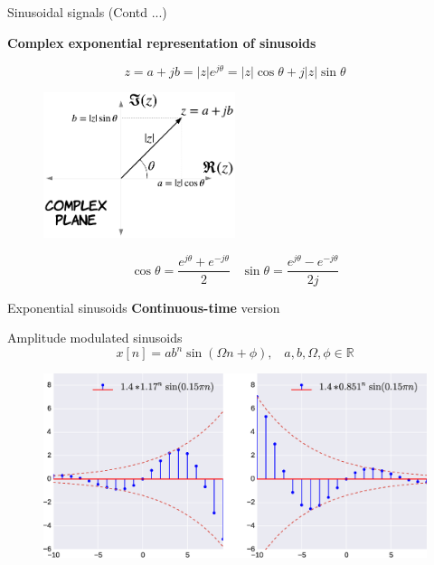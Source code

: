 \documentclass{beamer}
\begin{document}
\begin{frame}[t]{Sinusoidal signals (Contd ...)}\

\textbf{Complex exponential representation of sinusoids}

\[ z = a + jb = \left|z\right|e^{j\theta} = \left|z\right|\cos \theta + j \left|z\right|\sin \theta\]

\begin{figure}
\includegraphics[width=0.5\textwidth]{img/complex_plane.png}
\end{figure}

\[ \cos \theta = \frac{e^{j\theta} + e^{-j\theta}}{2} \,\,\,\,\, \sin \theta = \frac{e^{j\theta} - e^{-j\theta}}{2j}\]

\end{frame}

\begin{frame}[t]{Exponential sinusoids}
\textbf{Continuous-time} version

Amplitude modulated sinusoids
\[ x[n] = a b^{n} \sin \left(\Omega n + \phi \right), \,\,\,\,\, a, b, \Omega, \phi \in \mathbb{R}\]

\begin{figure}
\includegraphics[width=\textwidth]{img/disc_exp_sin.eps}
\end{figure}

\end{frame}
\end{document}
